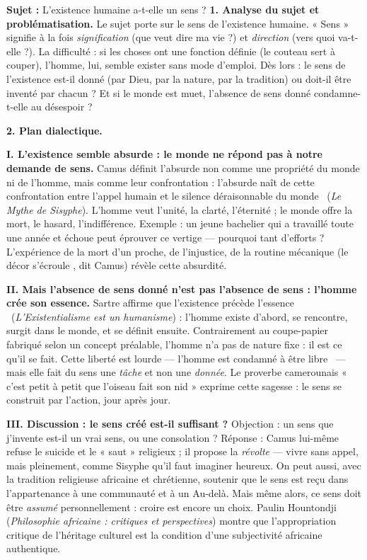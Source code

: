 \documentclass[11pt]{article}
\newcommand{\cle}[1]{{\popxbold\color{popdark}#1}}
\begin{document}
\begin{exoresolu}
\textbf{Sujet :} L'existence humaine a-t-elle un sens ?
\tcblower
\textbf{1. Analyse du sujet et problématisation.} Le sujet porte sur le \cle{sens} de l'\cle{existence humaine}. « Sens » signifie à la fois \emph{signification} (que veut dire ma vie ?) et \emph{direction} (vers quoi va-t-elle ?). La difficulté : si les choses ont une fonction définie (le couteau sert à couper), l'homme, lui, semble exister sans mode d'emploi. Dès lors : le sens de l'existence est-il donné (par Dieu, par la nature, par la tradition) ou doit-il être inventé par chacun ? Et si le monde est muet, l'absence de sens donné condamne-t-elle au désespoir ?

\textbf{2. Plan dialectique.}

\textbf{I. L'existence semble absurde : le monde ne répond pas à notre demande de sens.}
Camus définit l'absurde non comme une propriété du monde ni de l'homme, mais comme leur confrontation : \guillemotleft l'absurde naît de cette confrontation entre l'appel humain et le silence déraisonnable du monde \guillemotright\ (\emph{Le Mythe de Sisyphe}). L'homme veut l'unité, la clarté, l'éternité ; le monde offre la mort, le hasard, l'indifférence. Exemple : un jeune bachelier qui a travaillé toute une année et échoue peut éprouver ce vertige — pourquoi tant d'efforts ? L'expérience de la mort d'un proche, de l'injustice, de la routine mécanique (\guillemotleft le décor s'écroule \guillemotright, dit Camus) révèle cette absurdité.

\textbf{II. Mais l'absence de sens donné n'est pas l'absence de sens : l'homme crée son essence.}
Sartre affirme que \guillemotleft l'existence précède l'essence \guillemotright\ (\emph{L'Existentialisme est un humanisme}) : l'homme existe d'abord, se rencontre, surgit dans le monde, et se définit ensuite. Contrairement au coupe-papier fabriqué selon un concept préalable, l'homme n'a pas de nature fixe : il est ce qu'il se fait. Cette liberté est lourde — \guillemotleft l'homme est condamné à être libre \guillemotright\ — mais elle fait du sens une \emph{tâche} et non une \emph{donnée}. Le proverbe camerounais « c'est petit à petit que l'oiseau fait son nid » exprime cette sagesse : le sens se construit par l'action, jour après jour.

\textbf{III. Discussion : le sens créé est-il suffisant ?}
Objection : un sens que j'invente est-il un vrai sens, ou une consolation ? Réponse : Camus lui-même refuse le suicide et le « saut » religieux ; il propose la \emph{révolte} — vivre sans appel, mais pleinement, comme Sisyphe qu'il faut imaginer heureux. On peut aussi, avec la tradition religieuse africaine et chrétienne, soutenir que le sens est reçu dans l'appartenance à une communauté et à un Au-delà. Mais même alors, ce sens doit être \emph{assumé} personnellement : croire est encore un choix. Paulin Hountondji (\emph{Philosophie africaine : critiques et perspectives}) montre que l'appropriation critique de l'héritage culturel est la condition d'une subjectivité africaine authentique.


\end{exoresolu}
\end{document}
